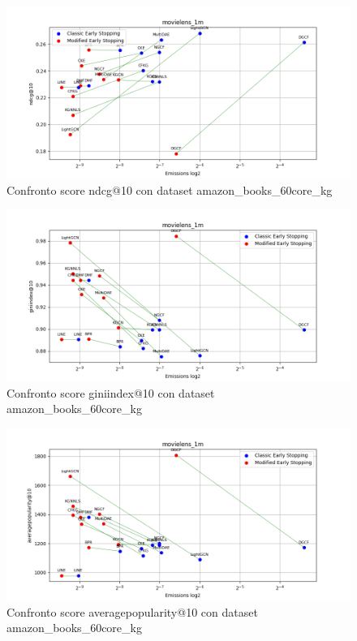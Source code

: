 \begin{figure}[H]
    \centering
    \includegraphics[width=\linewidth, trim=0 0 0 0]{images/ndcg@10_movielens_1m_40_5_comparison.png}
    \caption{Confronto score ndcg@10 con dataset amazon\_books\_60core\_kg}
    
\end{figure}

\begin{figure}[H]
    \centering
    \includegraphics[width=\linewidth, trim=0 0 0 0]{images/giniindex@10_movielens_1m_40_5_comparison.png}
    \caption{Confronto score giniindex@10 con dataset amazon\_books\_60core\_kg}
\end{figure}

\begin{figure}[H]
    \centering
    \includegraphics[width=\linewidth, trim=0 0 0 0]{images/averagepopularity@10_movielens_1m_40_5_comparison.png}
    \caption{Confronto score averagepopularity@10 con dataset amazon\_books\_60core\_kg}
\end{figure}



